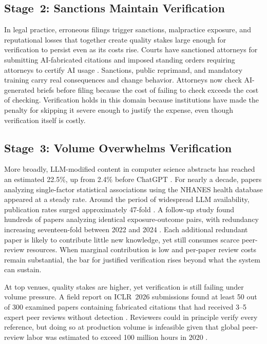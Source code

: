 \documentclass{article}
\theoremstyle{plain}
\theoremstyle{definition}
\theoremstyle{remark}
\begin{document}
\subsection{Stage~2: Sanctions Maintain Verification}
\label{sec:stage2}

In legal practice, erroneous filings trigger sanctions, malpractice exposure, and reputational losses that together create quality stakes large enough for verification to persist even as its costs rise. Courts have sanctioned attorneys for submitting AI-fabricated citations \citep{mata2023sanctions} and imposed standing orders requiring attorneys to certify AI usage \citep{baylson2023aiorder}. Sanctions, public reprimand, and mandatory training carry real consequences and change behavior. Attorneys now check AI-generated briefs before filing because the cost of failing to check exceeds the cost of checking. Verification holds in this domain because institutions have made the penalty for skipping it severe enough to justify the expense, even though verification itself is costly.

\vspace{1pt}

\subsection{Stage~3: Volume Overwhelms Verification}
\label{sec:stage3}

More broadly, LLM-modified content in computer science abstracts has reached an estimated 22.5\%, up from 2.4\% before ChatGPT \citep{liang-etal-2025-quantifying}. For nearly a decade, papers analyzing single-factor statistical associations using the NHANES health database appeared at a steady rate. Around the period of widespread LLM availability, publication rates surged approximately 47-fold \citep{suchak-etal-2025-explosion}. A follow-up study found hundreds of papers analyzing identical exposure-outcome pairs, with redundancy increasing seventeen-fold between 2022 and 2024 \citep{maupin-etal-2025-dramatic}. Each additional redundant paper is likely to contribute little new knowledge, yet still consumes scarce peer-review resources. When marginal contribution is low and per-paper review costs remain substantial, the bar for justified verification rises beyond what the system can sustain.

At top venues, quality stakes are higher, yet verification is still failing under volume pressure. A field report on ICLR~2026 submissions found at least 50 out of 300 examined papers containing fabricated citations that had received 3--5 expert peer reviews without detection \citep{esau-etal-2025-gptzero}. Reviewers could in principle verify every reference, but doing so at production volume is infeasible given that global peer-review labor was estimated to exceed 100 million hours in 2020 \citep{aczel2021estimating}.
\end{document}
